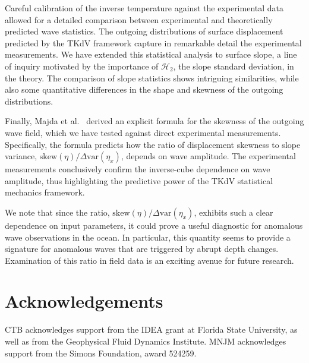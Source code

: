 \documentclass[11pt]{article}
\newcommand{\skw}{\text{skew}}
\newcommand{\var}{\text{var}}
\newcommand{\Ham}{\mathcal{H}}
\newcommand{\Htwo}{\Ham_{2}}
\begin{document}
	Careful calibration of the inverse temperature against the experimental data allowed for a detailed comparison between experimental and theoretically predicted wave statistics. The outgoing distributions of surface displacement predicted by the TKdV framework capture in remarkable detail the experimental measurements. We have extended this statistical analysis to surface slope, a line of inquiry motivated by the importance of $\Htwo$, the slope standard deviation, in the theory. The comparison of slope statistics shows intriguing similarities, while also some quantitative differences in the shape and skewness of the outgoing distributions.
	
	Finally, Majda et al.~\cite{majda2019} derived an explicit formula for the skewness of the outgoing wave field, which we have tested against direct experimental measurements. Specifically, the formula predicts how the ratio of displacement skewness to slope variance, $\skw(\eta) / \Delta \var(\eta_x)$, depends on wave amplitude. The experimental measurements conclusively confirm the inverse-cube dependence on wave amplitude, thus highlighting the predictive power of the TKdV statistical mechanics framework.
	
	We note that since the ratio, $\skw(\eta) / \Delta \var(\eta_x)$, exhibits such a clear dependence on input parameters, it could prove a useful diagnostic for anomalous wave observations in the ocean. In particular, this quantity seems to provide a signature for anomalous waves that are triggered by abrupt depth changes. Examination of this ratio in field data is an exciting avenue for future research.


\section*{Acknowledgements}
CTB acknowledges support from the IDEA grant at Florida State University, as well as from the Geophysical Fluid Dynamics Institute. 
MNJM acknowledges support from the Simons Foundation, award 524259. 



\end{document}
